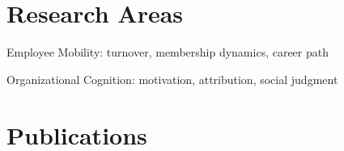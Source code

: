 \documentclass[12pt,letterpaper]{report} %
\newcommand{\listitemspace}{0.2em}
\renewenvironment{itemize}
{\begin{list}{}{\setlength{\leftmargin}{0em}
                \setlength{\parskip}{0em}
                \setlength{\itemsep}{\listitemspace}
                \setlength{\parsep}{\listitemspace}}}
{\end{list}}
\begin{document}








    \section*{Research Areas}

    \begin{itemize}

        \item Employee Mobility: turnover, membership dynamics, career path
        \item Organizational Cognition: motivation, attribution, social judgment

    \end{itemize}


    \section*{Publications}
\end{document}

